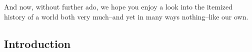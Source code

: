 		And now, without further ado, we hope you enjoy a look into the itemized history of a world both very much--and yet in many ways nothing--like our own. \par
		
		\clearpage  
\restoregeometry
\begin{multicols}{2}
	\tableofcontents
	\newpage
	\thispagestyle{plain}
	\chapter*{Introduction}
	\label{chap:intro}
	
	\clearpage
\end{multicols}